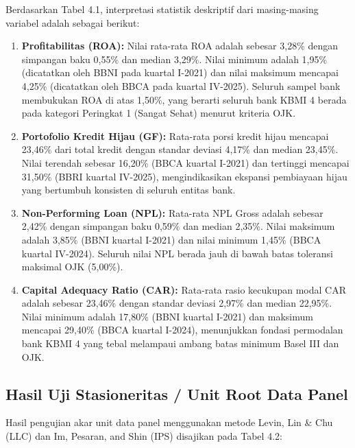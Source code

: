 \documentclass[12pt,a4paper]{article}
\numberwithin{equation}{section}
\begin{document}
\noindent
Berdasarkan Tabel 4.1, interpretasi statistik deskriptif dari masing-masing variabel adalah sebagai berikut:
\begin{enumerate}
  \item \textbf{Profitabilitas (ROA):} Nilai rata-rata ROA adalah sebesar 3,28\% dengan simpangan baku 0,55\% dan median 3,29\%. Nilai minimum adalah 1,95\% (dicatatkan oleh BBNI pada kuartal I-2021) dan nilai maksimum mencapai 4,25\% (dicatatkan oleh BBCA pada kuartal IV-2025). Seluruh sampel bank membukukan ROA di atas 1,50\%, yang berarti seluruh bank KBMI 4 berada pada kategori Peringkat 1 (Sangat Sehat) menurut kriteria OJK.
  \item \textbf{Portofolio Kredit Hijau (GF):} Rata-rata porsi kredit hijau mencapai 23,46\% dari total kredit dengan standar deviasi 4,17\% dan median 23,45\%. Nilai terendah sebesar 16,20\% (BBCA kuartal I-2021) dan tertinggi mencapai 31,50\% (BBRI kuartal IV-2025), mengindikasikan ekspansi pembiayaan hijau yang bertumbuh konsisten di seluruh entitas bank.
  \item \textbf{Non-Performing Loan (NPL):} Rata-rata NPL Gross adalah sebesar 2,42\% dengan simpangan baku 0,59\% dan median 2,35\%. Nilai maksimum adalah 3,85\% (BBNI kuartal I-2021) dan nilai minimum 1,45\% (BBCA kuartal IV-2024). Seluruh nilai NPL berada jauh di bawah batas toleransi maksimal OJK (5,00\%).
  \item \textbf{Capital Adequacy Ratio (CAR):} Rata-rata rasio kecukupan modal CAR adalah sebesar 23,46\% dengan standar deviasi 2,97\% dan median 22,95\%. Nilai minimum adalah 17,80\% (BBNI kuartal I-2021) dan maksimum mencapai 29,40\% (BBCA kuartal I-2024), menunjukkan fondasi permodalan bank KBMI 4 yang tebal melampaui ambang batas minimum Basel III dan OJK.
\end{enumerate}

\subsection{Hasil Uji Stasioneritas / Unit Root Data Panel}

\noindent
Hasil pengujian akar unit data panel menggunakan metode Levin, Lin \& Chu (LLC) dan Im, Pesaran, and Shin (IPS) disajikan pada Tabel 4.2:
\end{document}
